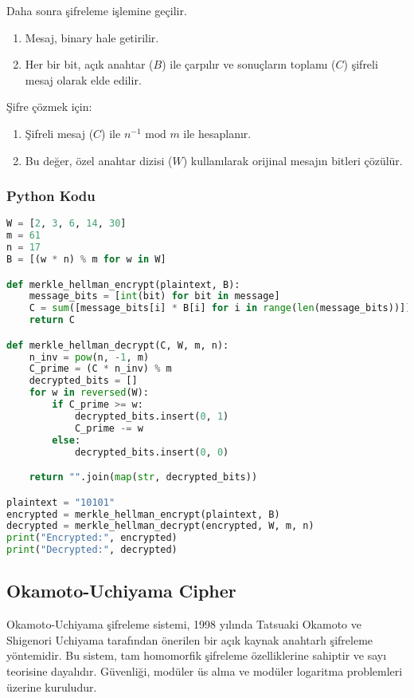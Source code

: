 Daha sonra şifreleme işlemine geçilir.

\begin{enumerate}
    \item Mesaj, binary hale getirilir.
    \item Her bir bit, açık anahtar ($B$) ile çarpılır ve sonuçların toplamı ($C$) şifreli mesaj olarak elde edilir.
\end{enumerate}

Şifre çözmek için:

\begin{enumerate}
    \item Şifreli mesaj ($C$) ile $n^{-1} \text{ mod } m$ ile hesaplanır.
    \item Bu değer, özel anahtar dizisi ($W$) kullanılarak orijinal mesajın bitleri çözülür.
\end{enumerate}

\subsubsection{Python Kodu}

\begin{lstlisting}[language=Python]
W = [2, 3, 6, 14, 30]
m = 61
n = 17
B = [(w * n) % m for w in W]

def merkle_hellman_encrypt(plaintext, B):
    message_bits = [int(bit) for bit in message]
    C = sum([message_bits[i] * B[i] for i in range(len(message_bits))])
    return C

def merkle_hellman_decrypt(C, W, m, n):
    n_inv = pow(n, -1, m)
    C_prime = (C * n_inv) % m
    decrypted_bits = []
    for w in reversed(W):
        if C_prime >= w:
            decrypted_bits.insert(0, 1)
            C_prime -= w
        else:
            decrypted_bits.insert(0, 0)

    return "".join(map(str, decrypted_bits))

plaintext = "10101"
encrypted = merkle_hellman_encrypt(plaintext, B)
decrypted = merkle_hellman_decrypt(encrypted, W, m, n)
print("Encrypted:", encrypted)
print("Decrypted:", decrypted)
\end{lstlisting}

\newpage

\subsection{Okamoto-Uchiyama Cipher}

Okamoto-Uchiyama şifreleme sistemi, 1998 yılında Tatsuaki Okamoto ve Shigenori Uchiyama tarafından önerilen bir açık kaynak anahtarlı şifreleme yöntemidir. Bu sistem, tam homomorfik şifreleme özelliklerine sahiptir ve sayı teorisine dayalıdır. Güvenliği, modüler üs alma ve modüler logaritma problemleri üzerine kuruludur.


